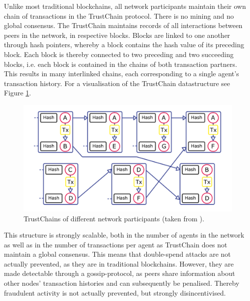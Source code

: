 \noindent{}Unlike most traditional blockchains, all network participants maintain their own chain of transactions in the TrustChain protocol. There is no mining and no global consensus. The TrustChain maintains records of all interactions between peers in the network, in respective blocks. Blocks are linked to one another through hash pointers, whereby a block contains the hash value of its preceding block. Each block is thereby connected to two preceding and two succeeding blocks, i.e. each block is contained in the chains of both transaction partners. This results in many interlinked chains, each corresponding to a single agent's transaction history. For a visualisation of the TrustChain datastructure see Figure \ref{fig:Trustchain}. \vspace{1em}\\

\begin{figure}[H]
\begin{center}
\includegraphics[scale=0.5]{Trustchain.png}
\caption{TrustChains of different network participants (taken from \cite{TrustChain: A Sybil-resistant scalable blockchain}).}
\label{fig:Trustchain}
\end{center}
\end{figure} 

\noindent{}This structure is strongly scalable, both in the number of agents in the network as well as in the number of transactions per agent as TrustChain does not maintain a global consensus. This means that double-spend attacks are not actually prevented, as they are in traditional blockchains. However, they are made detectable through a gossip-protocol, as peers share information about other nodes' transaction histories and can subsequently be penalised. Thereby fraudulent activity is not actually prevented, but strongly disincentivised.\vspace{1em}\\


